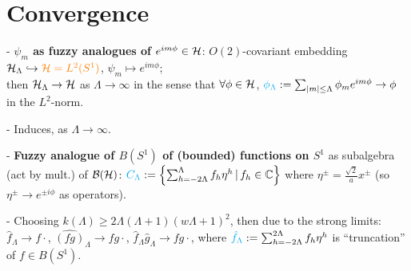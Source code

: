 \linea


\section{Convergence}

{
    \color{gray}
    
    - \textbf{$\psi_m$ as fuzzy analogues of $e^{i m \phi} \in \hcal$}: $O(2)$-covariant embedding $\mathcal H_\Lambda \hookrightarrow \textcolor{orange}{\mathcal H = L^2(S^1)}$, $\psi_m \mapsto e^{im\phi}$; \hfill \\then $\mathcal H_\Lambda \to \mathcal H$ as $\Lambda \to \infty$ in the sense that $\forall \phi \in \hcal$, $\lbtext{\phi_\Lambda} := \sum_{|m| \leq \Lambda} \phi_m e^{im\phi} \to \phi$ in the $L^2$-norm.
    
    - Induces,  as $\Lambda \to \infty$.
    
    - \textbf{Fuzzy analogue of $B(S^1)$ of (bounded) functions on $S^1$} as subalgebra (act by mult.) of $\mathcal B(\mathcal H)$: $\textcolor{cyan}{C_\Lambda} := \left\{ \sum_{h = -2\Lambda}^\Lambda f_h \eta^h \,|\, f_h \in \mathbb{C}\right\}$ where $\eta^\pm  = \frac{\sqrt{2}}{a}x^\pm$ (so $\eta^\pm \to e^{\pm i \phi}$ as operators).
    
    - Choosing $k(\Lambda) \geq 2 \Lambda(\Lambda + 1)(w\Lambda+1)^2$, then  due to the strong limits: $\hat f_\Lambda \to f\cdot$, $\hat{(fg)}_\Lambda \to fg\cdot $, $\hat f_\Lambda \hat g_\Lambda \to fg\cdot$, where $\textcolor{cyan}{\hat f_\Lambda} := \sum_{h = -2\Lambda}^{2\Lambda} f_h \eta^h$ is ``truncation'' of $f \in B(S^1)$.
    
}

\linea

